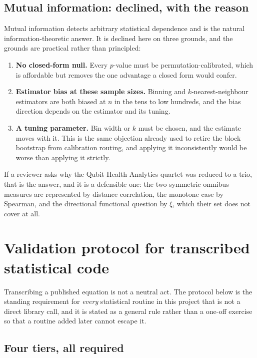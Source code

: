 \documentclass[11pt,a4paper]{article}
\begin{document}
\subsection{Mutual information: declined, with the reason}

Mutual information detects arbitrary statistical dependence and is the natural
information-theoretic answer. It is declined here on three grounds, and the grounds are
practical rather than principled:

\begin{enumerate}[leftmargin=1.6em,itemsep=2pt]
\item \textbf{No closed-form null.} Every $p$-value must be permutation-calibrated, which
is affordable but removes the one advantage a closed form would confer.
\item \textbf{Estimator bias at these sample sizes.} Binning and $k$-nearest-neighbour
estimators are both biased at $n$ in the tens to low hundreds, and the bias direction
depends on the estimator and its tuning.
\item \textbf{A tuning parameter.} Bin width or $k$ must be chosen, and the estimate moves
with it. This is the same objection already used to retire the block bootstrap from
calibration routing, and applying it inconsistently would be worse than applying it
strictly.
\end{enumerate}

\noindent
If a reviewer asks why the Qubit Health Analytics quartet was reduced to a trio, that is
the answer, and it is a defensible one: the two symmetric omnibus measures are
represented by distance correlation, the monotone case by Spearman, and the directional
functional question by $\xi$, which their set does not cover at all.

\section{Validation protocol for transcribed statistical code}
\label{sec:validation}

Transcribing a published equation is not a neutral act. The protocol below is the
standing requirement for \emph{every} statistical routine in this project that is not a
direct library call, and it is stated as a general rule rather than a one-off exercise so
that a routine added later cannot escape it.

\subsection{Four tiers, all required}
\end{document}
